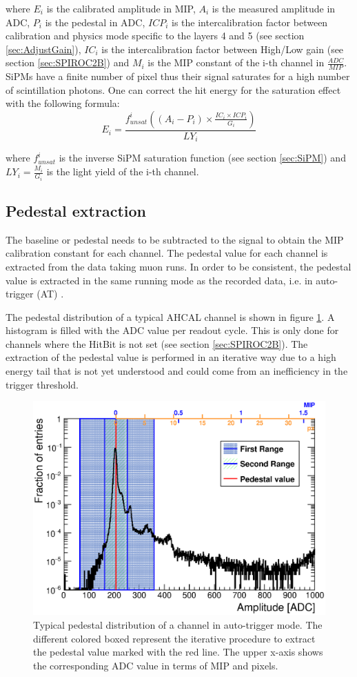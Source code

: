 where $E_i$ is the calibrated amplitude in MIP, $A_i$ is the measured amplitude in ADC, $P_i$ is the pedestal in ADC, $ICP_i$ is the intercalibration factor between calibration and physics mode specific to the layers 4 and 5 (see section \ref{sec:AdjustGain}), $IC_i$ is the intercalibration factor between High/Low gain (see section \ref{sec:SPIROC2B}) and $M_{i}$ is the MIP constant of the i-th channel in $\frac{ADC}{MIP}$. SiPMs have a finite number of pixel thus their signal saturates for a high number of scintillation photons. One can correct the hit energy for the saturation effect with the following formula:
\begin{equation}
	E_i = \frac{f^{i}_{unsat}( (A_i - P_i) \times \frac{IC_i \times ICP_i}{G_i} )}{LY_{i}}
\end{equation}

where $f^{i}_{unsat}$ is the inverse SiPM saturation function (see section \ref{sec:SiPM}) and $LY_{i} = \frac{M_{i}}{G_i}$ is the light yield of the i-th channel.

\subsection{Pedestal extraction}

The baseline or pedestal needs to be subtracted to the signal to obtain the MIP calibration constant for each channel. The pedestal value for each channel is extracted from the data taking muon runs. In order to be consistent, the pedestal value is extracted in the same running mode as the recorded data, i.e. in auto-trigger (AT) \cite{Hermberg:2015gaa, SarahMaster}.

The pedestal distribution of a typical AHCAL channel is shown in figure \ref{fig:PedExtraction}. A histogram is filled with the ADC value per readout cycle. This is only done for channels where the HitBit is not set (see section \ref{sec:SPIROC2B}). The extraction of the pedestal value is performed in an iterative way due to a high energy tail that is not yet understood and could come from an inefficiency in the trigger threshold.

\begin{figure}[htbp!]
	\centering
	\includegraphics[width=0.6\linewidth]{../Thesis_Plots/EnergyCalib/Plots/PedestalExtractionExample.eps}
	\caption{Typical pedestal distribution of a channel in auto-trigger mode. The different colored boxed represent the iterative procedure to extract the pedestal value marked with the red line. The upper x-axis shows the corresponding ADC value in terms of MIP and pixels.} \label{fig:PedExtraction}
\end{figure}

